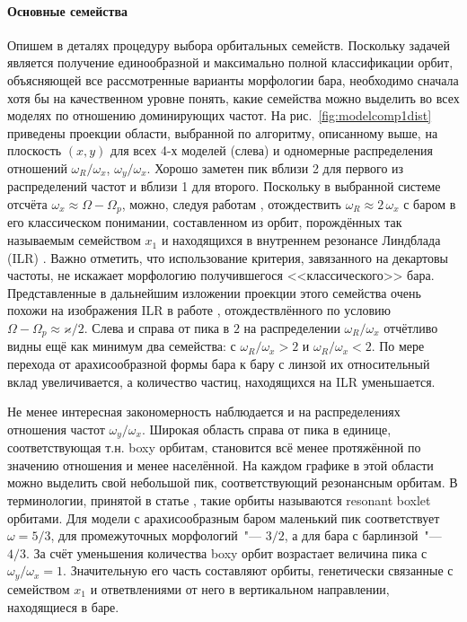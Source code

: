 \documentclass[tikz]{trlnotes}
\begin{document}
\paragraph{Основные семейства}
Опишем в деталях процедуру выбора орбитальных семейств. 
Поскольку задачей является получение единообразной и максимально полной классификации орбит, объясняющей все рассмотренные варианты морфологии бара, необходимо сначала хотя бы на качественном уровне понять, какие семейства можно выделить во всех моделях по отношению доминирующих частот. На рис.~\ref{fig:modelcomp1dist} приведены проекции области,
выбранной по алгоритму, описанному выше, на плоскость $(x,y)$ для всех 4-х моделей (слева) и одномерные распределения отношений $ω_R/ω_x$, $ω_y/ω_x$. Хорошо заметен пик вблизи
2 для первого из распределений частот и вблизи 1 для второго. Поскольку в выбранной системе отсчёта $ω_x \approx Ω - Ω_p$, можно, следуя работам \citet{gajda2016,portail2015}, отождествить $ω_R \approx 2\, ω_x$ с баром в его классическом
понимании, составленном из орбит,
порождённых так называемым семейством $x_1$ и находящихся в внутреннем резонансе Линдблада (ILR) \citep{athanassoula2003}.
Важно отметить, что использование критерия, завязанного на декартовы частоты, не искажает морфологию получившегося <<классического>> бара. Представленные в дальнейшим изложении
проекции этого семейства очень похожи на изображения ILR в работе \citet[Fig.~10]{ceverino2007}, отождествлённого по условию $Ω - Ω_p \approx ϰ/2$. Слева и справа от пика в $2$ на распределении $ω_R/ω_x$ отчётливо видны ещё как минимум два семейства:
с $ω_R/ω_x > 2$ и $ω_R/ω_x < 2$.  По мере перехода от арахисообразной формы бара к бару с линзой их
относительный вклад увеличивается, а количество частиц, находящихся на
ILR уменьшается. 

Не менее интересная закономерность наблюдается и на распределениях отношения частот $ω_y/ω_x$. Широкая область справа от пика в единице,
соответствующая т.н. boxy орбитам, становится всё менее протяжённой по значению отношения и менее населённой. На каждом графике в этой области
можно выделить свой небольшой пик, соответствующий резонансным орбитам. В терминологии, принятой в статье \cite{valluri2016}, такие орбиты
называются resonant boxlet орбитами. Для модели с арахисообразным баром маленький пик соответствует $ω=5/3$, для промежуточных морфологий~"--- $3/2$, а для бара с барлинзой~"--- $4/3$.
За счёт уменьшения количества boxy орбит возрастает величина пика с $ω_y/ω_x = 1$. Значительную его часть
составляют орбиты, генетически связанные с семейством $x_1$ и ответвлениями от него в вертикальном направлении, находящиеся в баре.
\end{document}
